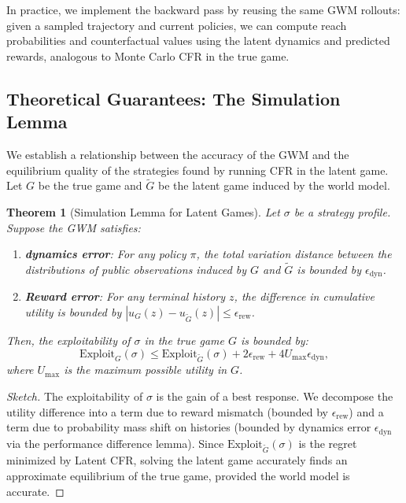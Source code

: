 \documentclass{article}
\begin{document}
In practice, we implement the backward pass by reusing the same GWM rollouts: given a sampled trajectory and current policies, we can compute reach probabilities and counterfactual values using the latent dynamics and predicted rewards, analogous to Monte Carlo CFR in the true game.

\subsection{Theoretical Guarantees: The Simulation Lemma}
We establish a relationship between the accuracy of the GWM and the equilibrium quality of the strategies found by running CFR in the latent game. Let $G$ be the true game and $\tilde{G}$ be the latent game induced by the world model.

\newtheorem{theorem}{Theorem}
\begin{theorem}[Simulation Lemma for Latent Games]
Let $\sigma$ be a strategy profile. Suppose the GWM satisfies:
\begin{enumerate}
    \item \textbf{ dynamics error}: For any policy $\pi$, the total variation distance between the distributions of public observations induced by $G$ and $\tilde{G}$ is bounded by $\epsilon_\text{dyn}$.
    \item \textbf{Reward error}: For any terminal history $z$, the difference in cumulative utility is bounded by $|u_G(z) - u_{\tilde{G}}(z)| \le \epsilon_\text{rew}$.
\end{enumerate}
Then, the exploitability of $\sigma$ in the true game $G$ is bounded by:
\begin{equation}
    \text{Exploit}_G(\sigma) \le \text{Exploit}_{\tilde{G}}(\sigma) + 2\epsilon_\text{rew} + 4 U_{\max} \epsilon_\text{dyn},
\end{equation}
where $U_{\max}$ is the maximum possible utility in $G$.
\end{theorem}

\begin{proof}[Sketch]
The exploitability of $\sigma$ is the gain of a best response. We decompose the utility difference into a term due to reward mismatch (bounded by $\epsilon_\text{rew}$) and a term due to probability mass shift on histories (bounded by dynamics error $\epsilon_\text{dyn}$ via the performance difference lemma). Since $\text{Exploit}_{\tilde{G}}(\sigma)$ is the regret minimized by Latent CFR, solving the latent game accurately finds an approximate equilibrium of the true game, provided the world model is accurate.
\end{proof}
\end{document}
